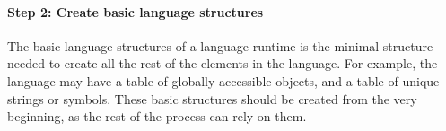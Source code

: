 

\paragraph{\textbf{Step 2: Create basic language structures}}

The basic language structures of a language runtime is the minimal structure needed to create all the rest of the elements in the language. For example, the language may have a table of globally accessible objects, and a table of unique strings or symbols. These basic structures should be created from the very beginning, as the rest of the process can rely on them.
%
%
%
%

